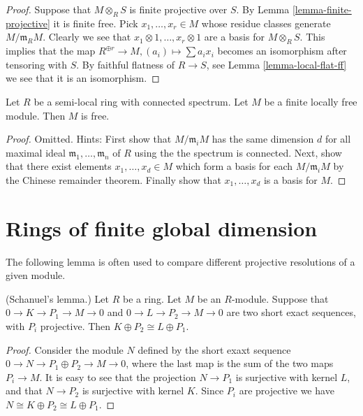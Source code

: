 \begin{proof}
Suppose that $M\otimes_R S$ is finite projective
over $S$. By Lemma \ref{lemma-finite-projective}
it is finite free. Pick $x_1, \ldots, x_r \in M$ whose
residue classes generate $M/\mathfrak m_RM$. Clearly
we see that $x_1 \otimes 1, \ldots, x_r \otimes 1$
are a basis for $M \otimes_R S$. This implies that
the map $R^{\oplus r} \to M, (a_i) \mapsto \sum a_i x_i$
becomes an isomorphism after tensoring with $S$.
By faithful flatness of $R \to S$, see Lemma \ref{lemma-local-flat-ff}
we see that it is an isomorphism.
\end{proof}

\begin{lemma}
\label{lemma-locally-free-semi-local-free}
Let $R$ be a semi-local ring with connected spectrum.
Let $M$ be a finite locally free module. Then $M$ is free.
\end{lemma}

\begin{proof}
Omitted. Hints: First show that $M/\mathfrak m_iM$ has the
same dimension $d$ for all maximal ideal $\mathfrak m_1, \ldots, \mathfrak m_n$
of $R$ using the the spectrum is connected.
Next, show that there exist elements $x_1, \ldots, x_d \in M$
which form a basis for each $M/\mathfrak m_iM$ by the Chinese
remainder theorem. Finally show that $x_1, \ldots, x_d$ is a basis for $M$.
\end{proof}










\section{Rings of finite global dimension}
\label{section-ring-finite-gl-dim}

\noindent
The following lemma is often used to compare different
projective resolutions of a given module.

\begin{lemma}
\label{lemma-Schanuel}
(Schanuel's lemma.)
Let $R$ be a ring. Let $M$ be an $R$-module.
Suppose that $0 \to K \to P_1 \to M \to 0$
and $0 \to L \to P_2 \to M \to 0$ are two short exact
sequences, with $P_i$ projective.
Then $K \oplus P_2 \cong L \oplus P_1$.
\end{lemma}

\begin{proof}
Consider the module
$N$ defined by the short exaxt sequence
$0 \to N \to P_1 \oplus P_2 \to M \to 0$,
where the last map is the sum of the two maps
$P_i \to M$. It is easy to see that the projection
$N \to P_1$ is surjective with kernel $L$, and that
$N \to P_2$ is surjective with kernel $K$.
Since $P_i$ are projective we have $N \cong K \oplus P_2
\cong L \oplus P_1$.
\end{proof}

